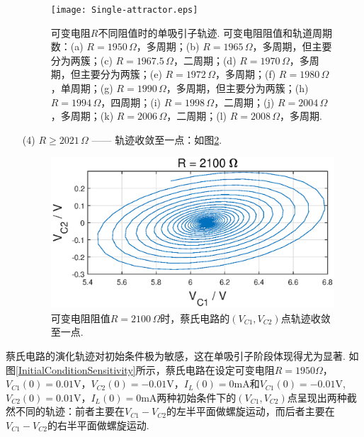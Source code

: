 \documentclass[a4paper, 10pt]{article}
\begin{document}
\begin{multicols*}{2}
\begin{itemize}
\begin{figure}[H]
        \centering
        \texttt{[image: Single-attractor.eps]}
        \caption{可变电阻$R$不同阻值时的单吸引子轨迹. 可变电阻阻值和轨道周期数：(a) $R=1950\,\Omega$，多周期；(b) $R=1965\,\Omega$，多周期，但主要分为两簇；(c) $R=1967.5\,\Omega$，二周期；(d) $R=1970\,\Omega$，多周期，但主要分为两簇；(e) $R=1972\,\Omega$，多周期；(f) $R=1980\,\Omega$，单周期；(g) $R=1990\,\Omega$，多周期，但主要分为两簇；(h) $R=1994\,\Omega$，四周期；(i) $R=1998\,\Omega$，二周期；(j) $R=2004\,\Omega$，多周期；(k) $R=2006\,\Omega$，二周期；(l) $R=2008\,\Omega$，多周期.}
        \label{Single-attractor}
    \end{figure}
    \item[(4)] $R\geq 2021\,\Omega$ —— 轨迹收敛至一点：如图\ref{Converge}.
    \begin{figure}[H]
        \centering
        \includegraphics[width=.8\columnwidth]{R=2100.eps}
        \caption{可变电阻阻值$R=2100\,\Omega$时，蔡氏电路的$(V_{C1},V_{C2})$点轨迹收敛至一点.}
        \label{Converge}
    \end{figure}
\end{itemize}

蔡氏电路的演化轨迹对初始条件极为敏感，这在单吸引子阶段体现得尤为显著. 如图\ref{InitialConditionSensitivity}所示，蔡氏电路在设定可变电阻$R=1950\Omega$，$V_{C1}(0)=0.01\mathrm{V}$，$V_{C2}(0)=-0.01\mathrm{V}$，$I_L(0)=0\mathrm{mA}$和$V_{C1}(0)=-0.01\mathrm{V}$,$V_{C2}(0)=0.01\mathrm{V}$，$I_L(0)=0\mathrm{mA}$两种初始条件下的$(V_{C1},V_{C2})$点呈现出两种截然不同的轨迹：前者主要在$V_{C1}-V_{C2}$的左半平面做螺旋运动，而后者主要在$V_{C1}-V_{C2}$的右半平面做螺旋运动.


\end{multicols*}
\end{document}
